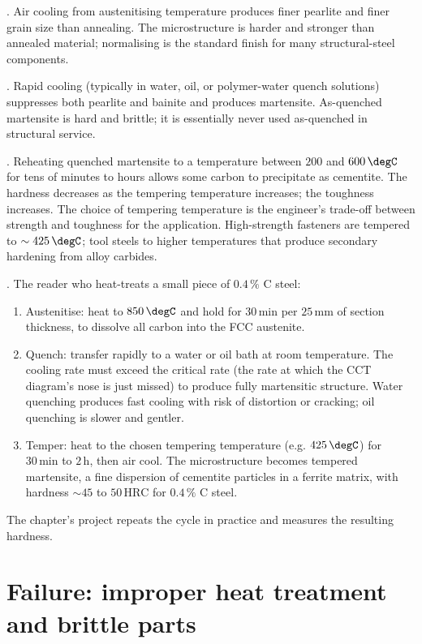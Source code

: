 . Air cooling from austenitising temperature
produces finer pearlite and finer grain size than annealing. The
microstructure is harder and stronger than annealed material;
normalising is the standard finish for many structural-steel
components.

. Rapid cooling (typically in water, oil, or
polymer-water quench solutions) suppresses both pearlite and bainite
and produces martensite. As-quenched martensite is hard and brittle;
it is essentially never used as-quenched in structural service.

. Reheating quenched martensite to a temperature
between $200$ and $600\,\degC$ for tens of minutes to hours allows
some carbon to precipitate as cementite. The hardness decreases as
the tempering temperature increases; the toughness increases. The
choice of tempering temperature is the engineer's trade-off between
strength and toughness for the application. High-strength fasteners
are tempered to $\sim 425\,\degC$; tool steels to higher temperatures
that produce secondary hardening from alloy carbides.

. The reader who
heat-treats a small piece of $0.4\,\%$ C steel:

\begin{enumerate}[leftmargin=*]
\item Austenitise: heat to $850\,\degC$ and hold for $30\,\text{min}$
  per $25\,\text{mm}$ of section thickness, to dissolve all carbon
  into the FCC austenite.
\item Quench: transfer rapidly to a water or oil bath at room
  temperature. The cooling rate must exceed the critical rate (the
  rate at which the CCT diagram's nose is just missed) to produce
  fully martensitic structure. Water quenching produces fast cooling
  with risk of distortion or cracking; oil quenching is slower and
  gentler.
\item Temper: heat to the chosen tempering temperature (e.g. $425\,
  \degC$) for $30\,\text{min}$ to $2\,\text{h}$, then air cool. The
  microstructure becomes tempered martensite, a fine dispersion of
  cementite particles in a ferrite matrix, with hardness $\sim 45$ to
  $50\,\text{HRC}$ for $0.4\,\%$ C steel.
\end{enumerate}

The chapter's project repeats the cycle in practice and measures the
resulting hardness.

\section{Failure: improper heat treatment and brittle parts}


